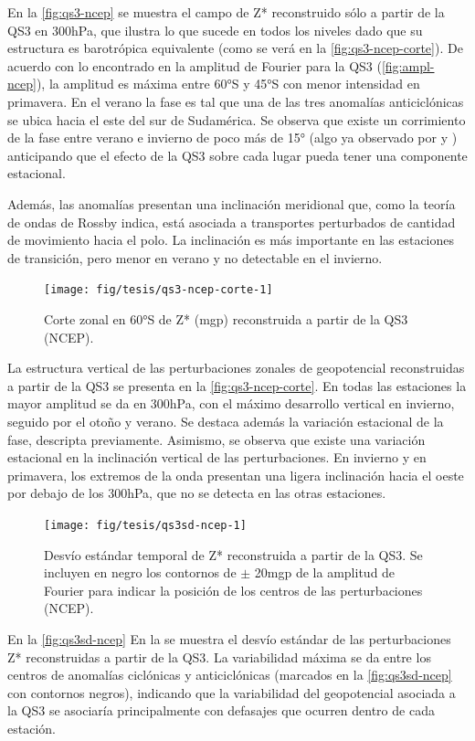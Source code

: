 \documentclass[spanish,a4paper,12pt,oneside]{book}
\begin{document}
En la \autoref{fig:qs3-ncep} se muestra el campo de Z* reconstruido sólo
a partir de la QS3 en 300hPa, que ilustra lo que sucede en todos los
niveles dado que su estructura es barotrópica equivalente (como se verá
en la \autoref{fig:qs3-ncep-corte}). De acuerdo con lo encontrado en la
amplitud de Fourier para la QS3 (\autoref{fig:ampl-ncep}), la amplitud
es máxima entre 60°S y 45°S con menor intensidad en primavera. En el
verano la fase es tal que una de las tres anomalías anticiclónicas se
ubica hacia el este del sur de Sudamérica. Se observa que existe un
corrimiento de la fase entre verano e invierno de poco más de 15° (algo
ya observado por \citet{Loon1972} y \citet{Mo1985}) anticipando que el
efecto de la QS3 sobre cada lugar pueda tener una componente estacional.

Además, las anomalías presentan una inclinación meridional que, como la
teoría de ondas de Rossby indica, está asociada a transportes
perturbados de cantidad de movimiento hacia el polo. La inclinación es
más importante en las estaciones de transición, pero menor en verano y
no detectable en el invierno.

\begin{figure}
\texttt{[image: fig/tesis/qs3-ncep-corte-1]} \caption{Corte zonal en 60°S de Z* (mgp) reconstruida a partir de la QS3 (NCEP).}\label{fig:qs3-ncep-corte}
\end{figure}

La estructura vertical de las perturbaciones zonales de geopotencial
reconstruidas a partir de la QS3 se presenta en la
\autoref{fig:qs3-ncep-corte}. En todas las estaciones la mayor amplitud
se da en 300hPa, con el máximo desarrollo vertical en invierno, seguido
por el otoño y verano. Se destaca además la variación estacional de la
fase, descripta previamente. Asimismo, se observa que existe una
variación estacional en la inclinación vertical de las perturbaciones.
En invierno y en primavera, los extremos de la onda presentan una ligera
inclinación hacia el oeste por debajo de los 300hPa, que no se detecta
en las otras estaciones.

\begin{figure}
\texttt{[image: fig/tesis/qs3sd-ncep-1]} \caption{Desvío estándar temporal de Z* reconstruida a partir de la QS3. Se incluyen en negro los contornos de $\pm$ 20mgp de la amplitud de Fourier para indicar la posición de los centros de las perturbaciones (NCEP).}\label{fig:qs3sd-ncep}
\end{figure}

En la \autoref{fig:qs3sd-ncep} En la se muestra el desvío estándar de
las perturbaciones Z* reconstruidas a partir de la QS3. La variabilidad
máxima se da entre los centros de anomalías ciclónicas y anticiclónicas
(marcados en la \autoref{fig:qs3sd-ncep} con contornos negros),
indicando que la variabilidad del geopotencial asociada a la QS3 se
asociaría principalmente con defasajes que ocurren dentro de cada
estación.
\end{document}
